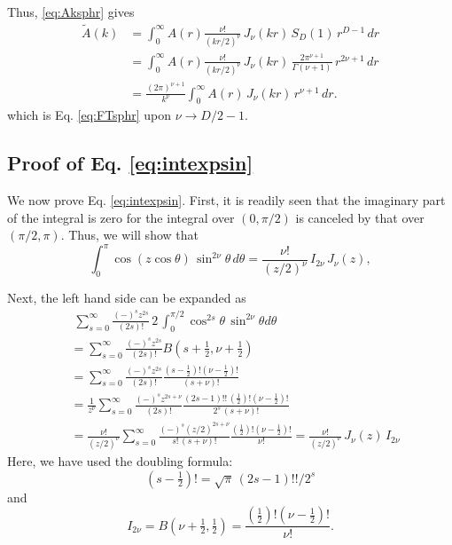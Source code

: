 \documentclass[preprint]{revtex4-1}
\numberwithin{equation}{subsection}
\numberwithin{table}{section}
\begin{document}
Thus, \eqref{eq:Aksphr} gives
\begin{align*}
  \tilde A(k)
&=
\int_0^\infty
A(r)
\frac{ \nu! } { (kr/2)^{\nu} } \, J_\nu(kr) \,
S_D(1) \, r^{D-1} \, dr
\\
&=
\int_0^\infty
A(r)
\frac{ \nu! } { (kr/2)^{\nu} } \, J_\nu(kr) \,
\frac{ 2 \pi^{\nu+1} }{ \Gamma(\nu+1) }
\, r^{2\nu+1} \, dr
\\
&=
\frac{(2\pi)^{\nu+1}}{k^{\nu}}
\int_0^\infty
A(r) \, J_\nu(kr) \,
r^{\nu+1} \, dr.
\end{align*}
which is Eq. \eqref{eq:FTsphr} upon $\nu \rightarrow D/2-1$.



\subsection{Proof of Eq. \eqref{eq:intexpsin} }



We now prove Eq. \eqref{eq:intexpsin}.
%
First, it is readily seen that
the imaginary part of the integral is zero
for the integral over $(0, \pi/2)$
is canceled by that over $(\pi/2, \pi)$.
%
Thus, we will show that
\begin{equation}
  \int_0^\pi
  \cos(z\cos\theta) \,
  \sin^{2\nu} \theta \,
  d \theta
=
  \frac{ \nu! }{ (z/2)^\nu } \,
  I_{2 \nu} \, J_\nu(z),
  \label{eq:intccossin}
\end{equation}

Next, the left hand side can be expanded as
%
\begin{align*}
& \;
  \sum_{s = 0}^\infty
  \frac{ (-)^s z^{2s} } { (2s)! }
  \,
  2 \, \int_0^{\pi/2} \cos^{2s} \theta \, \sin^{2\nu} \theta d \theta
  \\
&=
  \sum_{s = 0}^\infty
  \frac{ (-)^s z^{2s} } { (2s)! }
  B(s+\tfrac 1 2, \nu + \tfrac 1 2)
  \\
&=
  \sum_{s = 0}^\infty
  \frac{ (-)^s z^{2s} } { (2s)! }
  \frac{ (s-\tfrac 1 2)! (\nu - \tfrac 1 2)! }
       {  (s + \nu)!    }
  \\
&=
  \frac{1}{z^\nu}
  \sum_{s = 0}^\infty
  \frac{ (-)^s z^{2s + \nu} } { (2s)! }
  \frac{ (2s-1)!! \, (\tfrac 1 2)! (\nu - \tfrac 1 2)! }
      { 2^s \, (s + \nu)!    }
\\
&=
  \frac{\nu!}{(z/2)^\nu}
  \sum_{s = 0}^\infty
  \frac{ (-)^s (z/2)^{2s + \nu} } { s! \, (s + \nu)! }
  \frac{ (\tfrac 1 2)! (\nu - \tfrac 1 2)! }
       { \nu!    }
=
\frac{\nu!}{(z/2)^\nu} \, J_\nu(z) \, I_{2\nu}
\end{align*}
Here, we have used the doubling formula:
\begin{equation}
  (s - \tfrac 1 2)! = \sqrt\pi \, (2 s - 1)!! / 2^s
\end{equation}
and
\[
  I_{2\nu}
=
B(\nu + \tfrac{1}{2}, \tfrac{1}{2})
=
\frac{ (\tfrac 1 2)! (\nu - \tfrac 1 2)! }
       { \nu!    }.
\]
\end{document}
